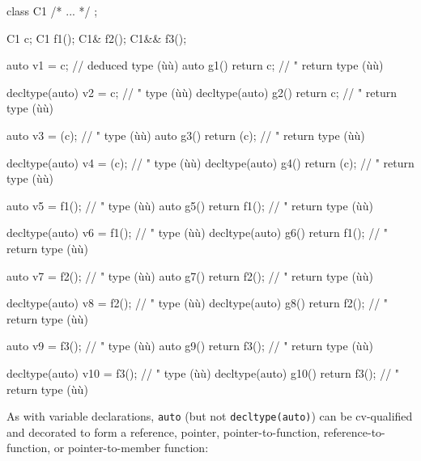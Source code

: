 \begin{emcppslisting}[emcppsbatch=e1,emcppsstandards={c++14}]
class C1 { /* ... */ };

C1   c;
C1   f1();
C1&  f2();
C1&& f3();

auto           v1 = c;                 // deduced type (ù{}ù)
auto           g1() { return c; }      //    "    return type (ù{}ù)

decltype(auto) v2 = c;                 //    "    type (ù{}ù)
decltype(auto) g2() { return c; }      //    "    return type (ù{}ù)

auto           v3 = (c);               //    "    type (ù{}ù)
auto           g3() { return (c); }    //    "    return type (ù{}ù)

decltype(auto) v4 = (c);               //    "    type (ù{}ù)
decltype(auto) g4() { return (c); }    //    "    return type (ù{}ù)

auto           v5 = f1();              //    "    type (ù{}ù)
auto           g5() { return f1(); }   //    "    return type (ù{}ù)

decltype(auto) v6 = f1();              //    "    type (ù{}ù)
decltype(auto) g6() { return f1(); }   //    "    return type (ù{}ù)

auto           v7 = f2();              //    "    type (ù{}ù)
auto           g7() { return f2(); }   //    "    return type (ù{}ù)

decltype(auto) v8 = f2();              //    "    type (ù{}ù)
decltype(auto) g8() { return f2(); }   //    "    return type (ù{}ù)

auto           v9 = f3();              //    "    type (ù{}ù)
auto           g9() { return f3(); }   //    "    return type (ù{}ù)

decltype(auto) v10 = f3();             //    "    type (ù{}ù)
decltype(auto) g10() { return f3(); }  //    "    return type (ù{}ù)
\end{emcppslisting}
    

\noindent As with variable declarations, \lstinline!auto! (but not
\lstinline!decltype(auto)!) can be cv-qualified and decorated to form a
reference, pointer, pointer-to-function, reference-to-function, or
pointer-to-member function:

